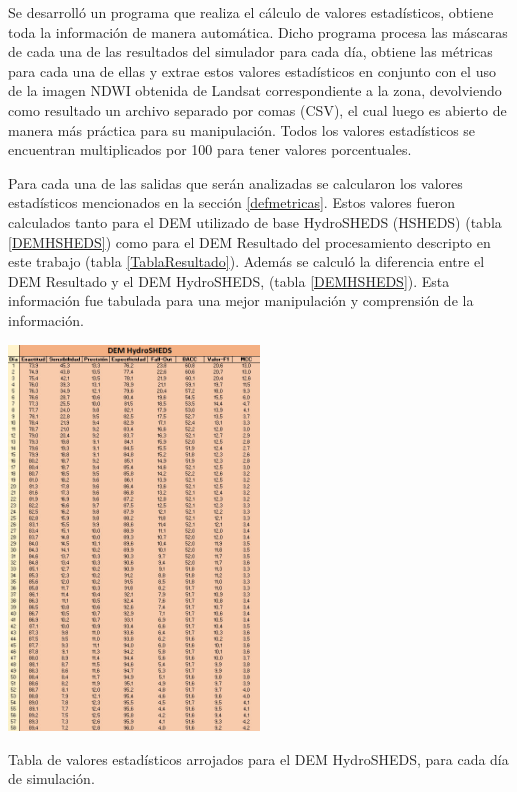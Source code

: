 \documentclass[10pt,a4paper, twoside]{report}
\begin{document}
Se desarrolló un programa que realiza el cálculo de valores estadísticos, obtiene toda la información de manera automática. Dicho programa procesa las máscaras de cada una de las resultados del simulador para cada día, obtiene las métricas para cada una de ellas y extrae estos valores estadísticos en conjunto con el uso de la imagen NDWI obtenida de Landsat correspondiente a la zona, devolviendo como resultado un archivo separado por comas (CSV), el cual luego es abierto de manera más práctica para su manipulación. Todos los valores estadísticos se encuentran multiplicados por 100 para tener valores porcentuales.

Para cada una de las salidas que serán analizadas se calcularon los valores estadísticos mencionados en la sección \ref{defmetricas}. Estos valores fueron calculados tanto para el DEM utilizado de base HydroSHEDS (HSHEDS) (tabla \ref{DEMHSHEDS}) como para el DEM Resultado del procesamiento descripto en este trabajo (tabla \ref{TablaResultado}). Además se calculó la diferencia entre el DEM Resultado y el DEM HydroSHEDS, (tabla \ref{DEMHSHEDS}). Esta información fue tabulada para una mejor manipulación y comprensión de la información.


\begin{table}[H]
   \centering      
   \includegraphics[width=0.5\textwidth]{imagenes/DEMHSHEDS2.jpg}
 \caption{Tabla de valores estadísticos arrojados para el DEM HydroSHEDS, para cada día de simulación.}
 \label{DEMHSHEDS}
\end{table}
\end{document}
